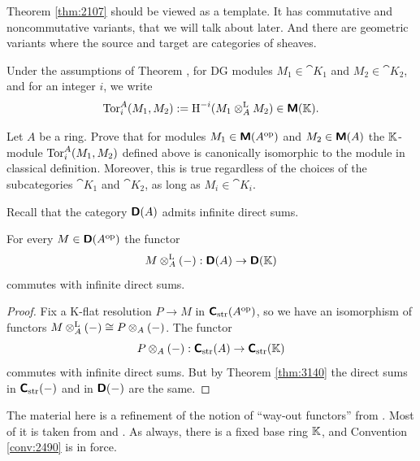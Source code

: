 \begin{rem} \label{rem:2105} 
Theorem \ref{thm:2107} should be viewed as a template. It has commutative and 
noncommutative variants, that we will talk about later. 
And there are geometric variants where the source and target are categories of 
sheaves.
\end{rem}

\begin{dfn} \label{dfn:4295} 
Under the assumptions of Theorem \tup{\ref{thm:2107}},  
for DG modules $M_1 \in \cat{K}_1$ and $M_2 \in \cat{K}_2$,
and for an integer $i$, we write%
\[ \operatorname{Tor}_i^{A}(M_1, M_2) := 
\operatorname{H}^{-i} ( M_1 \otimes^{\mathrm{L}}_{A} M_2 ) \in \boldsymbol{\mathsf{M}}(\mathbb{K}) . \]
\end{dfn}

\begin{exer} \label{exer:4295} 
Let $A$ be a ring. Prove that for modules
$M_1 \in \boldsymbol{\mathsf{M}}(A^{\mathrm{op}})$ and $M_2 \in \boldsymbol{\mathsf{M}}(A)$ the $\mathbb{K}$-module
$\operatorname{Tor}_i^{A}(M_1, M_2)$ defined above is canonically isomorphic to the 
module in classical definition. Moreover, this is true regardless of the 
choices of the subcategories $\cat{K}_1 $ and $\cat{K}_2$,
as long as $M_i \in \cat{K}_i$. 
\end{exer}

Recall that the category $\boldsymbol{\mathsf{D}}(A)$ admits infinite direct sums. 

\begin{prop} \label{prop:4300}
For every $M \in \boldsymbol{\mathsf{D}}(A^{\mathrm{op}})$ the functor 
\[ M \otimes^{\mathrm{L}}_{A} (-) : \boldsymbol{\mathsf{D}}(A) \to \boldsymbol{\mathsf{D}}(\mathbb{K}) \]
commutes with infinite direct sums. 
\end{prop}

\begin{proof}
Fix a K-flat resolution $P \to M$ in $\boldsymbol{\mathsf{C}}_{\mathrm{str}}(A^{\mathrm{op}})$, so 
we have an isomorphism of functors 
$M \otimes^{\mathrm{L}}_{A} (-) \cong P \otimes_A (-)$.
The functor 
\[ P \otimes_A (-) : \boldsymbol{\mathsf{C}}_{\mathrm{str}}(A) \to 
\boldsymbol{\mathsf{C}}_{\mathrm{str}}(\mathbb{K}) \]
commutes with infinite direct sums. But by Theorem \ref{thm:3140}
the direct sums in $\boldsymbol{\mathsf{C}}_{\mathrm{str}}(-)$ and in
$\boldsymbol{\mathsf{D}}(-)$ are the same. 
\end{proof}




\label{subsec:way-out}

The material here is a refinement of the notion of ``way-out functors'' from 
\cite[Section II.7]{RD}. Most of it is taken from 
\cite{RD} and \cite{Ye8}. As always, there is a fixed base ring $\mathbb{K}$, and 
Convention \ref{conv:2490} is in force. 


